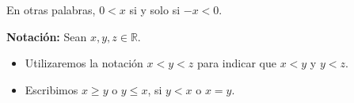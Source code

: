 \documentclass[11pt]{article}
\newcommand{\R}{\mathbb{R}}
\newcommand{\defined}{\coloneqq}
\newcommand{\bfit}[1]{\textbf{\textit{#1}}}
\let\set\Set
\begin{document}
En otras palabras, $0<x$ si y solo si $-x<0$.

\textbf{Notación:} Sean $x,y,z\in \R$.\begin{itemize}
    \item Utilizaremos la notación $x<y<z$ para indicar que $x<y$ y $y<z$.
    \item Escribimos $x\geq y$ o $y\leq x$, si $y<x$ o $x=y$.
\end{itemize}
%
%
%
%
\end{document}
